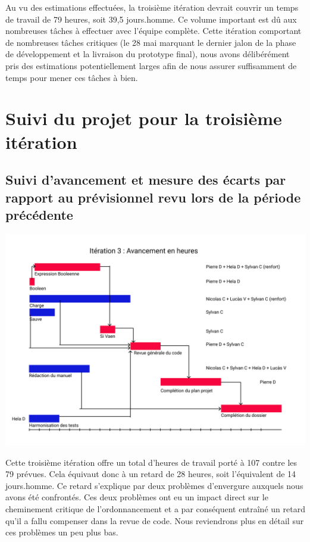 \documentclass[12pt,a4paper,titlepage,openany, oneside]{report}
\begin{document}
    Au vu des estimations effectuées, la troisième itération devrait couvrir un temps
    de travail de 79 heures, soit 39,5 jours.homme. Ce volume important est dû aux
    nombreuses tâches à effectuer avec l'équipe complète. Cette itération comportant de
    nombreuses tâches critiques (le 28 mai marquant le dernier jalon de la phase de
    développement et la livraison du prototype final), nous avons délibérément pris des estimations potentiellement larges
    afin de nous assurer suffisamment de temps pour mener ces tâches à bien.

    \section{Suivi du projet pour la troisième itération}

    \subsection{Suivi d’avancement et mesure des écarts par rapport au prévisionnel revu lors de la période précédente}

    \includegraphics[scale=0.75]{fichiers/planification/iteration3/iteration3Avancement.png}

    Cette troisième itération offre un total d'heures de travail porté à 107 contre les
    79 prévues. Cela équivaut donc à un retard de 28 heures, soit l'équivalent de
    14 jours.homme. Ce retard s'explique par deux problèmes d'envergure auxquels
    nous avons été confrontés. Ces deux problèmes ont eu un impact direct sur le
    cheminement critique de l'ordonnancement et a par conséquent entraîné un retard qu'il a fallu compenser dans la revue de code. Nous reviendrons plus en détail sur ces
    problèmes un peu plus bas.
\end{document}

